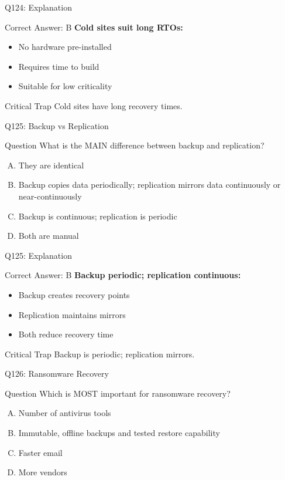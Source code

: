 \documentclass{beamer}
\begin{document}
	\begin{frame}{Q124: Explanation}
		\begin{block}{Correct Answer: B}
			\textbf{Cold sites suit long RTOs:}
			\begin{itemize}
				\item No hardware pre-installed
				\item Requires time to build
				\item Suitable for low criticality
			\end{itemize}
		\end{block}
		\begin{alertblock}{Critical Trap}
			Cold sites have long recovery times.
		\end{alertblock}
	\end{frame}
	
	\begin{frame}{Q125: Backup vs Replication}
		\begin{block}{Question}
			What is the MAIN difference between backup and replication?
		\end{block}
		\begin{enumerate}[(A)]
			\item They are identical
			\item Backup copies data periodically; replication mirrors data continuously or near-continuously
			\item Backup is continuous; replication is periodic
			\item Both are manual
		\end{enumerate}
	\end{frame}
	
	\begin{frame}{Q125: Explanation}
		\begin{block}{Correct Answer: B}
			\textbf{Backup periodic; replication continuous:}
			\begin{itemize}
				\item Backup creates recovery points
				\item Replication maintains mirrors
				\item Both reduce recovery time
			\end{itemize}
		\end{block}
		\begin{alertblock}{Critical Trap}
			Backup is periodic; replication mirrors.
		\end{alertblock}
	\end{frame}
	
	\begin{frame}{Q126: Ransomware Recovery}
		\begin{block}{Question}
			Which is MOST important for ransomware recovery?
		\end{block}
		\begin{enumerate}[(A)]
			\item Number of antivirus tools
			\item Immutable, offline backups and tested restore capability
			\item Faster email
			\item More vendors
		\end{enumerate}
	\end{frame}
	
\end{document}

